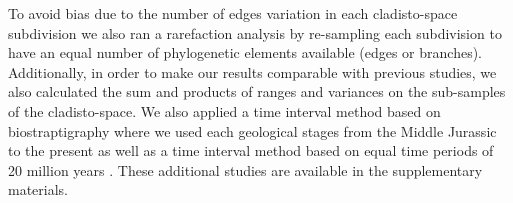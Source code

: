 \documentclass[12pt,letterpaper]{article}
\begin{document}

To avoid bias due to the number of edges variation in each cladisto-space subdivision we also ran a rarefaction analysis by re-sampling each subdivision to have an equal number of phylogenetic elements available (edges or branches). %
Additionally, in order to make our results comparable with previous studies, we also calculated the sum and products of ranges and variances \citep{Foote01071994,Wills1994} on the sub-samples of the cladisto-space.
We also applied a time interval method based on biostraptigraphy \citep[e.g.][]{cisneros2010,prentice2011,Hughes20082013,bentonmodels2014} where we used each geological stages from the Middle Jurassic to the present as well as a time interval method based on equal time periods of 20 million years \citep{hopkinsdecoupling2013,bensonfaunal2014}.
These additional studies are available in the supplementary materials. %


\end{document}
